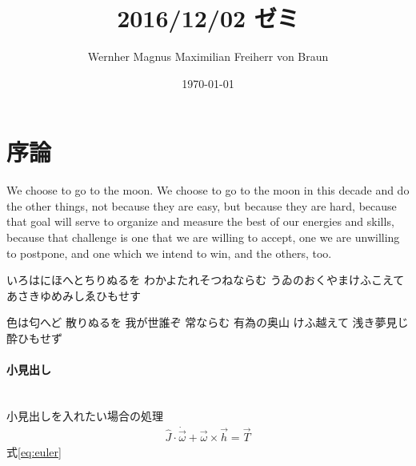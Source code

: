 \documentclass[a4paper,uplatex,dvipdfmx,ja=standard,11pt]{bxjsarticle}
\title{2016/12/02 ゼミ}
\author{Wernher Magnus Maximilian Freiherr von Braun}
\date{\today}
\begin{document}
	\maketitle
	
	\section{序論}
	We choose to go to the moon. We choose to go to the moon in this decade and do the other things, not because they are easy, but because they are hard, because that goal will serve to organize and measure the best of our energies and skills, because that challenge is one that we are willing to accept, one we are unwilling to postpone, and one which we intend to win, and the others, too.
	
	
	いろはにほへとちりぬるを
	わかよたれそつねならむ
	うゐのおくやまけふこえて
	あさきゆめみしゑひもせす
	
	色は匂へど 散りぬるを
	我が世誰ぞ 常ならむ
	有為の奥山 けふ越えて
	浅き夢見じ 酔ひもせず
	
	\paragraph{小見出し}\leavevmode\\
	\indent
	小見出しを入れたい場合の処理
	\begin{align}
		\hat{J} \cdot \dot{\vec{\omega}} + \vec{\omega}\times \vec{h}  = \vec{T} \label{eq:euler}
	\end{align}
	式\eqref{eq:euler}
	
\end{document}
